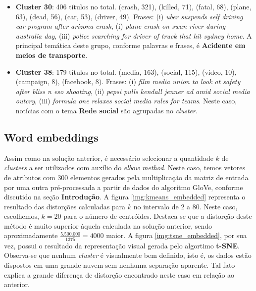 \documentclass[10pt,twocolumn,letterpaper]{article}
\begin{document}
\begin{itemize}
  \item \textbf {Cluster 30}: 406 títulos no total. (crash, 321), (killed, 71), (fatal, 68), (plane, 63), (dead, 56), (car, 53), (driver, 49). Frases: (i) \textit{uber suspends self driving car program after arizona crash}, (i) \textit{plane crash on swan river during australia day}, (iii) \textit{police searching for driver of truck that hit sydney home}. A principal temática deste grupo, conforme palavras e frases, é \textbf{Acidente em meios de transporte}.

  \item \textbf {Cluster 38}: 179 títulos no total. (media, 163), (social, 115), (video, 10), (campaign, 8), (facebook, 8).  Frases: (i) \textit{film media union to look at safety after bliss n eso shooting}, (ii) \textit{pepsi pulls kendall jenner ad amid social media outcry}, (iii) \textit{formula one relaxes social media rules for teams}. Neste caso, notícias com o tema \textbf {Rede social} são agrupadas no \textit{cluster}.

\end{itemize}

\subsection{Word embeddings}

Assim como na solução anterior, é necessário selecionar a quantidade \(k\) de \textit{clusters} a ser utilizados com auxílio do \textit{elbow method}. Neste caso, temos vetores de atributos com 300 elementos gerados pela multiplicação da matriz de entrada por uma outra pré-processada a partir de dados do algoritmo GloVe, conforme discutido na seção \textbf{Introdução}. A figura \ref{img:kmeans_embedded} representa o resultado das distorções calculadas para \(k\) no intervalo de 2 a 80. Neste caso, escolhemos, \(k = 20\) para o número de centróides. Destaca-se que a distorção deste método é muito superior àquela calculada na solução anterior, sendo aproximadamente \(\frac{5.500.000}{1375} = 4000\) maior. A figura \ref{img:tsne_embedded}, por sua vez, possui o resultado da representação visual gerada pelo algortimo \textbf{t-SNE}. Observa-se que nenhum \textit{cluster} é visualmente bem definido, isto é, os dados estão dispostos em uma grande nuvem sem nenhuma separação aparente. Tal fato explica a grande diferença de distorção encontrado neste caso em relação ao anterior.
\end{document}
